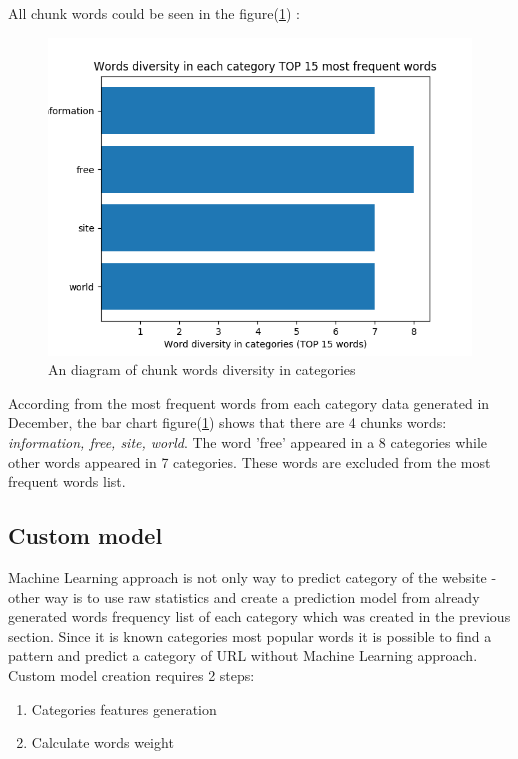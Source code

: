 All chunk words could be seen in the figure(\ref{fig:words_diversity}) :
\begin{figure}[H]
    \centering
    \includegraphics[width=1\textwidth]{Pictures/words_diversity.png}
    \caption{\label{fig:words_diversity}{}An diagram of chunk words diversity in categories }
\end{figure}


According from the most frequent words from each category data generated in December, the bar chart figure(\ref{fig:words_diversity}) shows that there are 4 chunks words: \textit{information, free, site, world}. The word 'free' appeared in a 8 categories while other words appeared in 7 categories. These words are excluded from the most frequent words list.

\subsection{Custom model}

Machine Learning approach is not only way to predict category of the website - other way is to use raw statistics and create a prediction model from already generated words frequency list of each category which was created in the previous section. Since it is known categories most popular words it is possible to find a pattern and predict a category of URL without Machine Learning approach. Custom model creation requires 2 steps:
\begin{enumerate}
    \item Categories features generation
    \item Calculate words weight
\end{enumerate}

